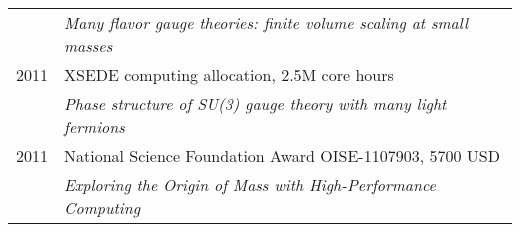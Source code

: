 \begin{spacelistout}
\begin{tabular}[t]{cl}
           & \textit{Many flavor gauge theories: finite volume scaling at small masses}                               \\[6 pt]
      2011 & XSEDE computing allocation, 2.5M core hours                                                              \\ %
           & \textit{Phase structure of SU(3) gauge theory with many light fermions}                                  \\[6 pt]
      2011 & National Science Foundation Award OISE-1107903, 5700 USD                                                 \\
           & \textit{Exploring the Origin of Mass with High-Performance Computing}                                    \\
    \end{tabular}


\end{spacelistout}
